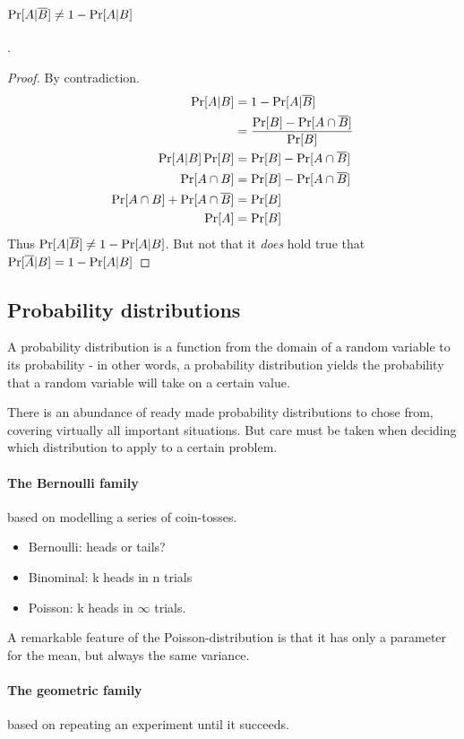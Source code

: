 \paragraph{$\operatorname{Pr}[A|\overline{B}] \neq 1 - \operatorname{Pr}[A | B]$}. 
 \begin{proof}
     By contradiction. 
     \begin{equation}
         \begin{aligned}
            \operatorname{Pr}[A|B]                 &= 1 - \operatorname{Pr}[A | \overline{B}] \\
                                            &= \frac{  \operatorname{Pr}[B] - \operatorname{Pr}[A \cap \overline{B}]  }{  \operatorname{Pr}[B]  }  \\
            \operatorname{Pr}[A|B] \operatorname{Pr}[B]   &=         \operatorname{Pr}[B] - \operatorname{Pr}[A \cap \overline{B}] \\
            \operatorname{Pr}[A \cap B]   &= \operatorname{Pr}[B] - \operatorname{Pr}[A \cap \overline{B}] \\
            \operatorname{Pr}[A \cap B] + \operatorname{Pr}[A \cap \overline{B}]  &= \operatorname{Pr}[B] \\
            \operatorname{Pr}[A] &= \operatorname{Pr}[B]
         \end{aligned}
     \end{equation}
     Thus $\operatorname{Pr}[A|\overline{B}] \neq 1 - \operatorname{Pr}[A | B]$. But not that it \emph{does} hold true that $\operatorname{Pr}[\overline{A}|B] = 1 - \operatorname{Pr}[A | B]$
 \end{proof}
 



\subsection{Probability distributions}

A probability distribution is a function from the domain of a random variable to its probability - in other words, a probability distribution yields the probability that a random variable will take on a certain value. 

There is an abundance of ready made probability distributions to chose from, covering virtually all important situations. But care must be taken when deciding which distribution to apply to a certain problem. 

\paragraph{The Bernoulli family} based on modelling a series of coin-tosses.
\begin{itemize}
    \item Bernoulli: heads or tails?
    \item Binominal: k heads in n trials
    \item Poisson: k heads in $\infty$ trials. 
\end{itemize}
A remarkable feature of the Poisson-distribution is that it has only a parameter for the mean, but always the same variance.

\paragraph{The geometric family} based on repeating an experiment until it succeeds. 
